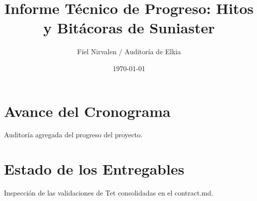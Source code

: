 \documentclass{article}
\title{Informe Técnico de Progreso: Hitos y Bitácoras de Suniaster}
\author{Fiel Nirvalen / Auditoría de Elkia}
\date{\today}
\begin{document}
\maketitle

\section{Avance del Cronograma}
Auditoría agregada del progreso del proyecto.

\section{Estado de los Entregables}
Inspección de las validaciones de Tet consolidadas en el contract.md.
\end{document}
